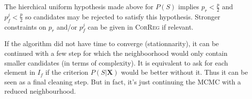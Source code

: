 \documentclass[11pt,a4paper]{article}
\begin{document}
	The hierchical uniform hypothesis made above for $P(S)$ implies $p_r<\frac{p}{2}$ and $p_f^j<\frac{p}{2}$ so candidates may be rejected to satisfy this hypothesis. Stronger constraints on $p_r$ and/or $p_f^j$ can be given in \textsc{CorReg} if relevant.
	
If the algorithm did not have time to converge (stationnarity), it can be continued with a few step for which the neighboorhood would only contain smaller candidates (in terms of complexity). It is equivalent to ask for each element in $I_f$ if the criterion $P(S|\boldsymbol{X})$ would be better without it. Thus it can be seen as a final cleaning step. But in fact, it's just continuing the MCMC with a reduced neighbourhood.	
	
	
	
\end{document}
